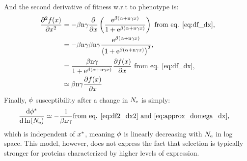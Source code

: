 And the second derivative of fitness w.r.t to phenotype is:
\begin{align}
\frac{\partial^2  f (x)}{\partial x^2} & = - \beta \text{n} \gamma \frac{\partial}{\partial x} \left( \frac{\mathrm{e}^{\beta(\alpha + \text{n} \gamma x)}}{1 + \mathrm{e}^{\beta(\alpha + \text{n} \gamma x)}} \right) \text{ from eq. \ref{eq:df_dx}}, \\
 & = - \beta \text{n} \gamma  \beta \text{n} \gamma \frac{\mathrm{e}^{\beta(\alpha + \text{n} \gamma x)}}{\left( 1 + \mathrm{e}^{\beta(\alpha + \text{n} \gamma x)}\right)^2}, \\
 & = \frac{\beta \text{n} \gamma}{1 + \mathrm{e}^{\beta(\alpha + \text{n} \gamma x)}} \frac{ \partial f (x) }{\partial x} \text{ from eq. \ref{eq:df_dx}} \label{eq:df2_dx2}, \\
 & \simeq \beta \text{n} \gamma \frac{ \partial f (x) }{\partial x} 
\end{align}
Finally, $\phi$ susceptibility after a change in $N_{\mathrm{e}}$ is simply:
\begin{align}
\frac{ \mathrm{d} \phi^{*}}{\mathrm{d} \ln (N_{\mathrm{e}})} & \simeq - \frac{1}{\beta \text{n} \gamma} \text{from eq. \ref{eq:df2_dx2} and \ref{eq:approx_domega_dx}},
\end{align}
which is independent of $x^{*}$, meaning $\phi$ is linearly decreasing with $N_{\mathrm{e}}$ in log space.
This model, however, does not express the fact that selection is typically stronger for proteins characterized by higher levels of expression. 
